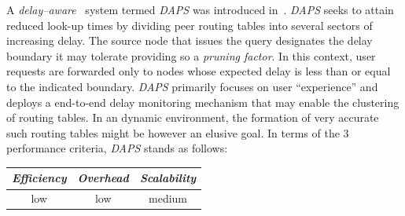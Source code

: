 A \emph{delay--aware} \p\ system termed {\sl DAPS} 
was introduced in~\cite{ZL2005}.
{\sl DAPS}  seeks to attain reduced look-up times by dividing 
peer routing tables into several sectors of increasing delay. 
The source node that issues the query designates the delay 
boundary it may tolerate providing so a \emph{pruning factor}.
In this context, user requests are forwarded only to 
nodes whose expected delay is less than or equal to the indicated boundary. 
{\sl DAPS} primarily focuses on user ``experience'' and deploys a
end-to-end delay monitoring mechanism that  may enable
the clustering of routing tables. 
In an dynamic environment, the formation 
of very accurate such routing tables might be however an elusive goal.
In terms of the $3$ performance criteria, {\sl DAPS} stands as follows:
\begin{center}
{\footnotesize
\begin{tabular}{ccc}
\emph{Efficiency} & \emph{Overhead} & \emph{Scalability} \\
\hline
%
low &
%
low &
%
medium
\end{tabular}
}
\end{center}


